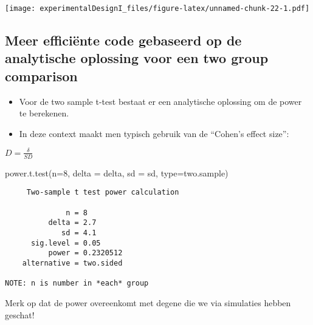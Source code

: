 \documentclass[
]{article}
\newenvironment{Shaded}{\begin{snugshade}}{\end{snugshade}}
\newcommand{\AttributeTok}[1]{\textcolor[rgb]{0.77,0.63,0.00}{#1}}
\newcommand{\DecValTok}[1]{\textcolor[rgb]{0.00,0.00,0.81}{#1}}
\newcommand{\FunctionTok}[1]{\textcolor[rgb]{0.00,0.00,0.00}{#1}}
\newcommand{\NormalTok}[1]{#1}
\newcommand{\StringTok}[1]{\textcolor[rgb]{0.31,0.60,0.02}{#1}}
\begin{document}
\texttt{[image: experimentalDesignI\_files/figure-latex/unnamed-chunk-22-1.pdf]}

\hypertarget{meer-efficiuxebnte-code-gebaseerd-op-de-analytische-oplossing-voor-een-two-group-comparison}{%
\subsection{Meer efficiënte code gebaseerd op de analytische oplossing
voor een two group
comparison}\label{meer-efficiuxebnte-code-gebaseerd-op-de-analytische-oplossing-voor-een-two-group-comparison}}

\begin{itemize}
\item
  Voor de two sample t-test bestaat er een analytische oplossing om de
  power te berekenen.
\item
  In deze context maakt men typisch gebruik van de ``Cohen's effect
  size'':
\end{itemize}

\(D = \frac{\delta}{SD}\)

\begin{Shaded}
\begin{Highlighting}[]
\FunctionTok{power.t.test}\NormalTok{(}\AttributeTok{n=}\DecValTok{8}\NormalTok{, }\AttributeTok{delta =}\NormalTok{ delta, }\AttributeTok{sd =}\NormalTok{ sd, }\AttributeTok{type=}\StringTok{\textquotesingle{}two.sample\textquotesingle{}}\NormalTok{)}
\end{Highlighting}
\end{Shaded}

\begin{verbatim}
     Two-sample t test power calculation 

              n = 8
          delta = 2.7
             sd = 4.1
      sig.level = 0.05
          power = 0.2320512
    alternative = two.sided

NOTE: n is number in *each* group
\end{verbatim}

Merk op dat de power overeenkomt met degene die we via simulaties hebben
geschat!
\end{document}
